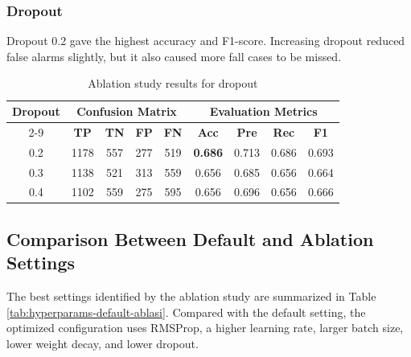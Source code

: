 \documentclass[10pt,TimesNewRoman,a4paper]{matrikenglish}
\begin{document}
\subsubsection{Dropout}
\label{IV.dropout}

Dropout 0.2 gave the highest accuracy and F1-score. Increasing dropout reduced false alarms slightly, but it also caused more fall cases to be missed.

\begin{table}[H]
    \centering
    \caption{Ablation study results for dropout}
    \label{tab:ablasi Dropout}
    \begin{tabular}{c c c c c c c c c}
        \hline
        \multirow{2}{*}{\textbf{Dropout}} & \multicolumn{4}{c}{\textbf{Confusion Matrix}} & \multicolumn{4}{c}{\textbf{Evaluation Metrics}} \\ \cline{2-9}
         & \textbf{TP} & \textbf{TN} & \textbf{FP} & \textbf{FN} & \textbf{Acc} & \textbf{Pre} & \textbf{Rec} & \textbf{F1} \\ \hline
        0.2 & 1178 & 557 & 277 & 519 & \textbf{0.686} & 0.713 & 0.686 & 0.693 \\ 
        0.3 & 1138 & 521 & 313 & 559 & 0.656 & 0.685 & 0.656 & 0.664 \\ 
        0.4 & 1102 & 559 & 275 & 595 & 0.656 & 0.696 & 0.656 & 0.666 \\ \hline
    \end{tabular}
\end{table}

\subsection{Comparison Between Default and Ablation Settings}
\label{IV.Analisis}

The best settings identified by the ablation study are summarized in Table \ref{tab:hyperparams-default-ablasi}. Compared with the default setting, the optimized configuration uses RMSProp, a higher learning rate, larger batch size, lower weight decay, and lower dropout.
\end{document}
